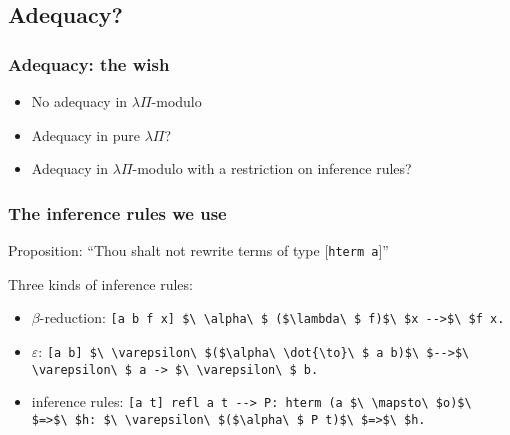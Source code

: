 \subsection{Adequacy?}

\begin{frame}
\frametitle{Adequacy: the wish}

\begin{itemize}
\item No adequacy in $\lambda\Pi$-modulo
\item Adequacy in pure $\lambda\Pi$?
\item Adequacy in $\lambda\Pi$-modulo with a restriction on inference
  rules?
\end{itemize}

\end{frame}


\begin{frame}
\frametitle{The inference rules we use}

\begin{block}{Proposition:}
  ``Thou shalt not rewrite terms of type [\lstinline!hterm a!]''
\end{block}

\pause

\begin{block}{Three kinds of inference rules:}
\begin{itemize}
\item $\beta$-reduction: \lstinline![a b f x] $\ \alpha\ $ ($\lambda\ $ f)$\ $x -->$\ $f x.! 
\item $\varepsilon$: \lstinline![a b] $\ \varepsilon\ $($\alpha\ \dot{\to}\ $ a b)$\ $-->$\ \varepsilon\ $ a -> $\ \varepsilon\ $ b.! 
\item inference rules: \lstinline![a t] refl a t --> P: hterm (a $\ \mapsto\ $o)$\ $=>$\ $h: $\ \varepsilon\ $($\alpha\ $ P t)$\ $=>$\ $h.! 
\end{itemize}
\end{block}

\end{frame}
